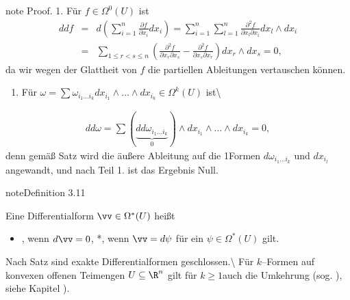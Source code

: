 \documentclass[letterpaper,10pt,english]{jupyterBook}
\begin{document}
\begin{sphinxadmonition}{note}
\sphinxAtStartPar
Proof. 1. Für \(f\in\Omega^0(U)\) ist
\begin{equation*}
\begin{split}ddf &=& d\left(\sum_{i=1}^n\frac{\partial f}
{\partial x_i}dx_i\right) = \sum_{i=1}^n\sum_{l=1}^n\frac{\partial^2f}{\partial x_l\partial x_i}
dx_l\wedge dx_i\\
& =& \sum_{1\leq r< s\leq n}\left(\frac{\partial^2 f}{\partial x_r
\partial x_s} - \frac{\partial^2f}{\partial x_s\partial x_r}\right)dx_r\wedge dx_s = 0,\end{split}
\end{equation*}
\sphinxAtStartPar
da wir wegen der Glattheit von \(f\) die partiellen Ableitungen vertauschen
können.
\begin{enumerate}
%
\item {} 
\sphinxAtStartPar
Für \(\omega = \sum\omega_{i_1\ldots i_k}dx_{i_1}\wedge\ldots\wedge dx_{i_k}
\in\Omega^k(U)\) ist\textbackslash{}

\end{enumerate}
\begin{equation*}
\begin{split}dd\omega = \sum(\underbrace{dd\omega_{i_1\ldots i_k}}_0)
\wedge dx_{i_1}\wedge\ldots\wedge dx_{i_k} = 0,\end{split}
\end{equation*}
\sphinxAtStartPar
denn gemäß Satz {\hyperref[\detokenize{vektoranalysis/diffformen:Antiderivation}]{}} wird die äußere Ableitung auf die
1\sphinxhyphen{}Formen \(d\omega_{i_1\ldots i_k}\) und \(dx_{i_l}\) angewandt, und nach Teil 1.
ist das Ergebnis Null.
\end{sphinxadmonition}
\label{vektoranalysis/diffformen:geschlossen:exakt}
\begin{sphinxadmonition}{note}{Definition 3.11}



\sphinxAtStartPar
Eine Differentialform \(\vv\in\Omega^*(U)\) heißt
\begin{itemize}
\item {} 
\sphinxAtStartPar
{}, wenn \(d\vv=0\), *, wenn \(\vv=d\psi\) für ein \(\psi\in\Omega^*(U)\) gilt.

\end{itemize}

\sphinxAtStartPar
Nach Satz {\hyperref[\detokenize{vektoranalysis/diffformen:thm:dd}]{}} sind exakte Differentialformen geschlossen.\textbackslash{} Für \(k\)–Formen auf konvexen offenen Teimengen \(U\subseteq \R^n\) gilt für \(k\ge 1\)auch die Umkehrung (sog.
 ),  siehe Kapitel ).
\end{sphinxadmonition}
\end{document}
